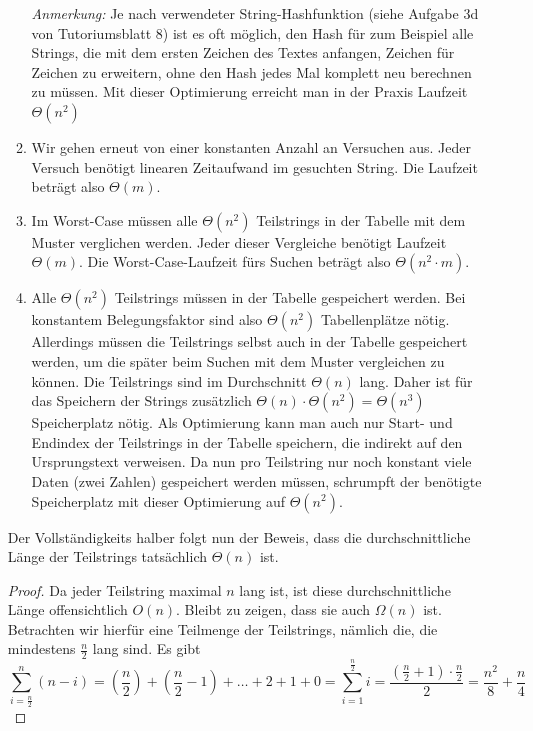 \documentclass[11pt,a4paper]{article}
\begin{document}
\begin{loesung}
\begin{enumerate}
\begin{enumerate}[label=\roman*)]
            \emph{Anmerkung:} Je nach verwendeter String-Hashfunktion (siehe Aufgabe 3d von Tutoriumsblatt 8) ist es oft möglich, den Hash für zum Beispiel alle Strings, die mit dem ersten Zeichen des Textes anfangen, Zeichen für Zeichen zu erweitern, ohne den Hash jedes Mal komplett neu berechnen zu müssen.
            Mit dieser Optimierung erreicht man in der Praxis Laufzeit $\Theta(n^2)$
            \item Wir gehen erneut von einer konstanten Anzahl an Versuchen aus.
            Jeder Versuch benötigt linearen Zeitaufwand im gesuchten String.
            Die Laufzeit beträgt also $\Theta(m)$.
            \item Im Worst-Case müssen alle $\Theta(n^2)$ Teilstrings in der Tabelle mit dem Muster verglichen werden.
            Jeder dieser Vergleiche benötigt Laufzeit $\Theta(m)$.
            Die Worst-Case-Laufzeit fürs Suchen beträgt also $\Theta(n^2\cdot m)$.
            \item Alle $\Theta(n^2)$ Teilstrings müssen in der Tabelle gespeichert werden.
            Bei konstantem Belegungsfaktor sind also $\Theta(n^2)$ Tabellenplätze nötig.
            Allerdings müssen die Teilstrings selbst auch in der Tabelle gespeichert werden, um die später beim Suchen mit dem Muster vergleichen zu können.
            Die Teilstrings sind im Durchschnitt $\Theta(n)$ lang.
            Daher ist für das Speichern der Strings zusätzlich $\Theta(n) \cdot \Theta(n^2) = \Theta(n^3)$ Speicherplatz nötig.
            Als Optimierung kann man auch nur Start- und Endindex der Teilstrings in der Tabelle speichern, die indirekt auf den Ursprungstext verweisen.
            Da nun pro Teilstring nur noch konstant viele Daten (zwei Zahlen) gespeichert werden müssen, schrumpft der benötigte Speicherplatz mit dieser Optimierung auf $\Theta(n^2)$.
        \end{enumerate}
        Der Vollständigkeits halber folgt nun der Beweis, dass die durchschnittliche Länge der Teilstrings tatsächlich $\Theta(n)$ ist.
        \begin{proof}
            Da jeder Teilstring maximal $n$ lang ist, ist diese durchschnittliche Länge offensichtlich $O(n)$.
            Bleibt zu zeigen, dass sie auch $\Omega(n)$ ist.
            Betrachten wir hierfür eine Teilmenge der Teilstrings, nämlich die, die mindestens $\frac{n}{2}$ lang sind.
            Es gibt 
            \begin{equation*}
                \sum\limits_{i = \frac{n}{2}}^n (n - i) = \left(\frac{n}{2}\right) + \left(\frac{n}{2} - 1\right) + \ldots + 2 + 1 + 0 = \sum\limits_{i = 1}^{\frac{n}{2}} i = \frac{\left(\frac{n}{2} + 1\right) \cdot \frac{n}{2}}{2} = \frac{n^2}{8} + \frac{n}{4} 

\end{equation*}
\end{proof}
\end{enumerate}
\end{loesung}
\end{document}
